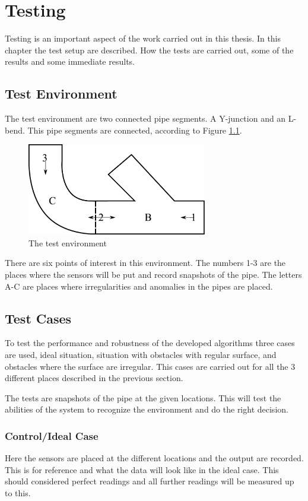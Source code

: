\chapter{Testing}
Testing is an important aspect of the work carried out in this thesis. In this chapter the
test setup are described. How the tests are carried out, some of the results and some
immediate results.


\section{Test Environment}
The test environment are two connected pipe segments. A Y-junction and an L-bend. This
pipe segments are connected, according to Figure \ref{chap7:fig-environment}.

\begin{figure}[htbp]
    \centering
    \includegraphics[width=0.7\textwidth]{pics/test-environment}
    \caption{The test environment}
    \label{chap7:fig-environment}
\end{figure}

There are six points of interest in this environment. 
The numbers 1-3 are the places where the sensors will be put and record snapshots of the pipe. 
The letters A-C are places where irregularities and anomalies in the pipes are placed. 


\section{Test Cases}
To test the performance and robustness of the developed algorithms three cases are used,
ideal situation, situation with obstacles with regular surface, and obstacles where the
surface are irregular. This cases are carried out for all the 3 different places described
in the previous section.

The tests are snapshots of the pipe at the given locations. This will test the abilities
of the system to recognize the environment and do the right decision. 


\subsection{Control/Ideal Case}
Here the sensors are placed at the different locations and the output are recorded. This
is for reference and what the data will look like in the ideal case. This should
considered perfect readings and all further readings will be measured up to this.


